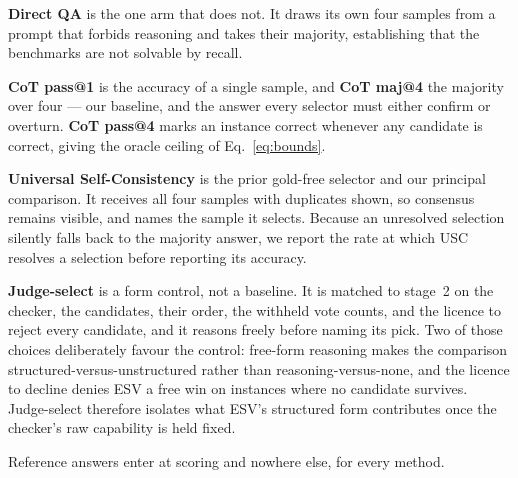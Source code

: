 \noindent\textbf{Direct QA} is the one arm that does not. It draws its own four
samples from a prompt that forbids reasoning and takes their majority,
establishing that the benchmarks are not solvable by recall.

\noindent\textbf{CoT pass@1} is the accuracy of a single sample, and
\textbf{CoT maj@4} \cite{wang2022self} the majority over four --- our baseline,
and the answer every selector must either confirm or overturn. \textbf{CoT
pass@4} marks an instance correct whenever any candidate is correct, giving the
oracle ceiling of Eq.~\eqref{eq:bounds}.

\noindent\textbf{Universal Self-Consistency} \cite{chen2023universal} is the
prior gold-free selector and our principal comparison. It receives all four
samples with duplicates shown, so consensus remains visible, and names the
sample it selects. Because an unresolved selection silently falls back to the
majority answer, we report the rate at which USC resolves a selection before
reporting its accuracy.

\noindent\textbf{Judge-select} is a form control, not a baseline. It is matched
to stage~2 on the checker, the candidates, their order, the withheld vote
counts, and the licence to reject every candidate, and it reasons freely before
naming its pick. Two of those choices deliberately favour the control: free-form
reasoning makes the comparison structured-versus-unstructured rather than
reasoning-versus-none, and the licence to decline denies ESV a free win on
instances where no candidate survives. Judge-select therefore isolates what
ESV's structured form contributes once the checker's raw capability is held
fixed.

Reference answers enter at scoring and nowhere else, for every method.

